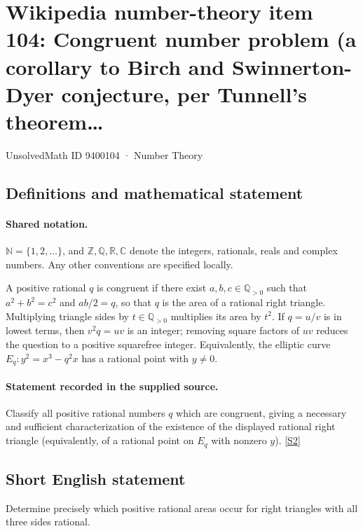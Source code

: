 \documentclass[11pt]{article}
\newcommand{\sref}[2]{\hyperlink{source:#1:#2}{[S#2]}}
\begin{document}
\setcounter{section}{9400103}
\section{Wikipedia number-theory item 104: Congruent number problem (a corollary to Birch and Swinnerton-Dyer conjecture, per Tunnell's theorem…}\label{9400104}
{\small\sffamily UnsolvedMath ID 9400104 · Number Theory}
\subsection{Definitions and mathematical statement}

\paragraph{Shared notation.}$\mathbb N=\{1,2,\ldots\}$, and $\mathbb Z,\mathbb Q,\mathbb R,\mathbb C$ denote the integers, rationals, reals and complex numbers. Any other conventions are specified locally.


A positive rational $q$ is congruent if there exist $a,b,c\in\mathbb Q_{>0}$ such that $a^2+b^2=c^2$ and $ab/2=q$, so that $q$ is the area of a rational right triangle. Multiplying triangle sides by $t\in\mathbb Q_{>0}$ multiplies its area by $t^2$. If $q=u/v$ is in lowest terms, then $v^2q=uv$ is an integer; removing square factors of $uv$ reduces the question to a positive squarefree integer. Equivalently, the elliptic curve $E_q:y^2=x^3-q^2x$ has a rational point with $y\ne0$.
\paragraph{Statement recorded in the supplied source.}
Classify all positive rational numbers $q$ which are congruent, giving a necessary and sufficient characterization of the existence of the displayed rational right triangle (equivalently, of a rational point on $E_q$ with nonzero $y$). \sref{9400104}{2}
\subsection{Short English statement}
Determine precisely which positive rational areas occur for right triangles with all three sides rational.
\end{document}
